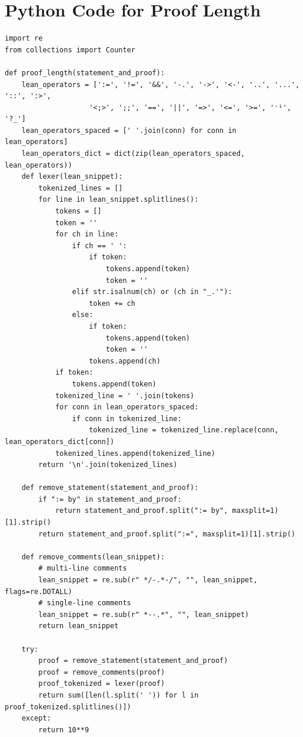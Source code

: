 \section{Python Code for Proof Length}
\begin{lstlisting}[breaklines=true, style=mystyle, language=Lean]
import re
from collections import Counter

def proof_length(statement_and_proof):
    lean_operators = [':=', '!=', '&&', '-.', '->', '<-', '..', '...', '::', ':>',
                    '<;>', ';;', '==', '||', '=>', '<=', '>=', '⁻¹', '?_']
    lean_operators_spaced = [' '.join(conn) for conn in lean_operators]
    lean_operators_dict = dict(zip(lean_operators_spaced, lean_operators))
    def lexer(lean_snippet):
        tokenized_lines = []
        for line in lean_snippet.splitlines():
            tokens = []
            token = ''
            for ch in line:
                if ch == ' ':
                    if token:
                        tokens.append(token)
                        token = ''
                elif str.isalnum(ch) or (ch in "_.'"):
                    token += ch
                else:
                    if token:
                        tokens.append(token)
                        token = ''
                    tokens.append(ch)
            if token:
                tokens.append(token)
            tokenized_line = ' '.join(tokens)
            for conn in lean_operators_spaced:
                if conn in tokenized_line:
                    tokenized_line = tokenized_line.replace(conn, lean_operators_dict[conn])
            tokenized_lines.append(tokenized_line)
        return '\n'.join(tokenized_lines)

    def remove_statement(statement_and_proof):
        if ":= by" in statement_and_proof:
            return statement_and_proof.split(":= by", maxsplit=1)[1].strip()
        return statement_and_proof.split(":=", maxsplit=1)[1].strip()

    def remove_comments(lean_snippet):
        # multi-line comments
        lean_snippet = re.sub(r" */-.*-/", "", lean_snippet, flags=re.DOTALL)
        # single-line comments
        lean_snippet = re.sub(r" *--.*", "", lean_snippet)
        return lean_snippet

    try:
        proof = remove_statement(statement_and_proof)
        proof = remove_comments(proof)
        proof_tokenized = lexer(proof)
        return sum([len(l.split(' ')) for l in proof_tokenized.splitlines()])
    except:
        return 10**9
\end{lstlisting}
